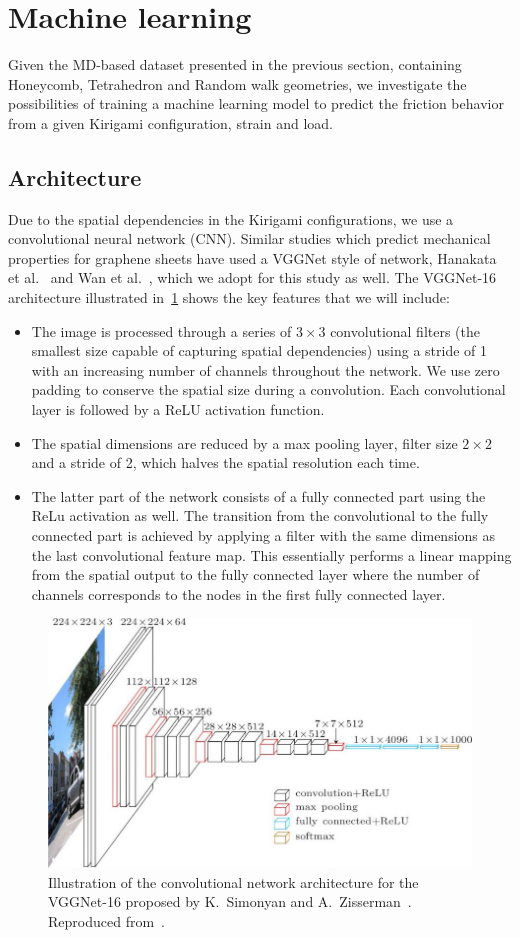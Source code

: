 \section{Machine learning}\label{eq:ML}
Given the \acrshort{MD}-based dataset presented in the previous section, containing Honeycomb, Tetrahedron and Random walk geometries, we investigate the possibilities of training a machine learning model to predict the friction behavior from a given Kirigami configuration, strain and load. 

\subsection{Architecture}
Due to the spatial dependencies in the Kirigami configurations, we use a convolutional neural network (\acrshort{CNN}). Similar studies which predict mechanical properties for graphene sheets have used a VGGNet style of network, Hanakata et al.~\cite{PhysRevLett.121.255304, PhysRevResearch.2.042006} and Wan et al.~\cite{graphene/hBN}, which we adopt for this study as well. The VGGNet-16 architecture illustrated in~\cref{fig:VGGNet16} shows the key features that we will include:
\begin{itemize}
  \item The image is processed through a series of $3 \times 3$ convolutional filters (the smallest size capable of capturing spatial dependencies) using a stride of 1 with an increasing number of channels throughout the network. We use zero padding to conserve the spatial size during a convolution. Each convolutional layer is followed by a ReLU activation function. 
  \item The spatial dimensions are reduced by a max pooling layer, filter size $2 \times 2$ and a stride of 2, which halves the spatial resolution each time. 
  \item The latter part of the network consists of a fully connected part using the ReLu activation as well. The transition from the convolutional to the fully connected part is achieved by applying a filter with the same dimensions as the last convolutional feature map. This essentially performs a linear mapping from the spatial output to the fully connected layer where the number of channels corresponds to the nodes in the first fully connected layer.
\end{itemize}

\begin{figure}[!htb]
  \centering
  \includegraphics[width=0.6\linewidth]{figures/ML/VGGNet16.jpg}
  \caption{Illustration of the convolutional network architecture for the VGGNet-16 proposed by K.\ Simonyan and A.\ Zisserman~\cite{simonyan2015deep}. Reproduced from~\cite{VGGNet_16_image}.}
  \label{fig:VGGNet16}
\end{figure}


